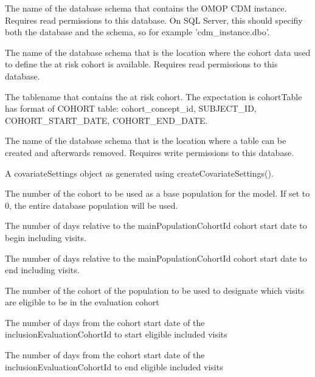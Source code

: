 \documentclass[a4paper]{book}
\begin{document}
\begin{Arguments}
\begin{ldescription}
\item[\code{cdmDatabaseSchema}] The name of the database schema that contains the OMOP CDM
instance. Requires read permissions to this database. On SQL
Server, this should specifiy both the database and the
schema, so for example 'cdm\_instance.dbo'.

\item[\code{cohortDatabaseSchema}] The name of the database schema that is the location where
the cohort data used to define the at risk cohort is
available. Requires read permissions to this database.

\item[\code{cohortTable}] The tablename that contains the at risk cohort. The
expectation is cohortTable has format of COHORT table:
cohort\_concept\_id, SUBJECT\_ID, COHORT\_START\_DATE,
COHORT\_END\_DATE.

\item[\code{workDatabaseSchema}] The name of the database schema that is the location where
a table can be created and afterwards removed.
Requires write permissions to this database.

\item[\code{covariateSettings}] A covariateSettings object as generated using
createCovariateSettings().

\item[\code{modelPopulationCohortId}] The number of the cohort to be used as a base population for
the model. If set to 0, the entire database population will be
used.

\item[\code{modelPopulationCohortIdStartDay}] The number of days relative to the mainPopulationCohortId
cohort start date to begin including visits.

\item[\code{modelPopulationCohortIdEndDay}] The number of days relative to the mainPopulationCohortId
cohort start date to end including visits.

\item[\code{inclusionEvaluationCohortId}] The number of the cohort of the population to be used to designate which visits
are eligible to be in the evaluation cohort

\item[\code{inclusionEvaluationDaysFromStart}] The number of days from the cohort start date of the inclusionEvaluationCohortId
to start eligible included visits

\item[\code{inclusionEvaluationDaysFromEnd}] The number of days from the cohort start date of the inclusionEvaluationCohortId
to end eligible included visits


\end{ldescription}
\end{Arguments}
\end{document}

